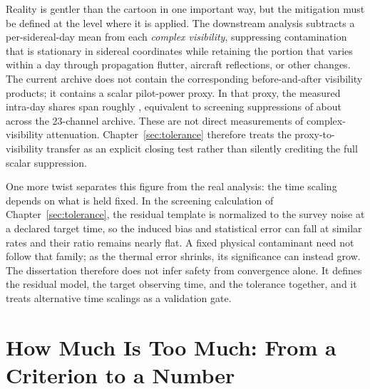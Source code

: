 Reality is gentler than the cartoon in one important way, but the mitigation must be defined at the level where it is applied. The downstream analysis subtracts a per-sidereal-day mean from each \emph{complex visibility}, suppressing contamination that is stationary in sidereal coordinates while retaining the portion that varies within a day through propagation flutter, aircraft reflections, or other changes. The current archive does not contain the corresponding before-and-after visibility products; it contains a scalar pilot-power proxy. In that proxy, the measured intra-day shares span roughly , equivalent to screening suppressions of about  across the 23-channel archive. These are not direct measurements of complex-visibility attenuation. Chapter~\ref{sec:tolerance} therefore treats the proxy-to-visibility transfer as an explicit closing test rather than silently crediting the full scalar suppression.

One more twist separates this figure from the real analysis: the time scaling depends on what is held fixed. In the screening calculation of Chapter~\ref{sec:tolerance}, the residual template is normalized to the survey noise at a declared target time, so the induced bias and statistical error can fall at similar rates and their ratio remains nearly flat. A fixed physical contaminant need not follow that family; as the thermal error shrinks, its significance can instead grow. The dissertation therefore does not infer safety from convergence alone. It defines the residual model, the target observing time, and the tolerance together, and it treats alternative time scalings as a validation gate.

\section{How Much Is Too Much: From a Criterion to a Number}
\label{sec:intro:tolerance}

